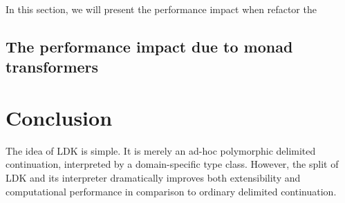 In this section, we will present the performance impact when refactor the 


\subsection{The performance impact due to monad transformers}











\section{Conclusion}\label{conclusion}

The idea of LDK is simple. It is merely an ad-hoc polymorphic delimited continuation, interpreted by a domain-specific type class. However, the split of LDK and its interpreter dramatically improves both extensibility and computational performance in comparison to ordinary delimited continuation.


\clearpage
\appendix

\printglossary

\begin{acks}
\end{acks}


